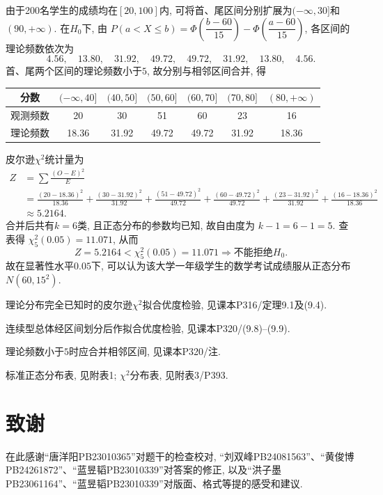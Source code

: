 \documentclass[standard]{ExBook}
\begin{document}
\begin{qitems}
由于200名学生的成绩均在$[20,100]$内, 可将首、尾区间分别扩展为$(-\infty,30]$和$(90,+\infty)$. 在$H_0$下, 由
$
P(a<X\leqslant b)
=\Phi\left(\dfrac{b-60}{15}\right)
-\Phi\left(\dfrac{a-60}{15}\right)
$,
各区间的理论频数依次为
$$
4.56,\quad 13.80,\quad 31.92,\quad 49.72,\quad
49.72,\quad 31.92,\quad 13.80,\quad 4.56.
$$
首、尾两个区间的理论频数小于$5$, 故分别与相邻区间合并, 得
\begin{center}
\setlength{\tabcolsep}{14pt}
\begin{tabular}{c|cccccc}
\hline
分数 & $(-\infty,40]$ & $(40,50]$ & $(50,60]$
& $(60,70]$ & $(70,80]$ & $(80,+\infty)$\\
\hline
观测频数 & 20 & 30 & 51 & 60 & 23 & 16\\
理论频数 & 18.36 & 31.92 & 49.72 & 49.72 & 31.92 & 18.36\\
\hline
\end{tabular}
\end{center}
皮尔逊$\chi^2$统计量为
$$
\begin{aligned}
Z
&=\sum\frac{(O-E)^2}{E}\\
&=\frac{(20-18.36)^2}{18.36}
+\frac{(30-31.92)^2}{31.92}
+\frac{(51-49.72)^2}{49.72}
+\frac{(60-49.72)^2}{49.72}
+\frac{(23-31.92)^2}{31.92}
+\frac{(16-18.36)^2}{18.36}\\
&\approx5.2164.
\end{aligned}
$$
合并后共有$k=6$类, 且正态分布的参数均已知, 故自由度为
$
k-1=6-1=5
$.
查表得
$
\chi_5^2(0.05)=11.071
$,
从而
$$
Z=5.2164<\chi_5^2(0.05)=11.071
\Longrightarrow
\text{不能拒绝}H_0.
$$
故在显著性水平$0.05$下, 可以认为该大学一年级学生的数学考试成绩服从正态分布$N(60,15^2)$.

\textcolor{themeColor}{\selectfont {} 理论分布完全已知时的皮尔逊$\chi^2$拟合优度检验, 见课本P316/定理9.1及(9.4).}

\textcolor{themeColor}{\selectfont {} 连续型总体经区间划分后作拟合优度检验, 见课本P320/(9.8)--(9.9).}

\textcolor{themeColor}{\selectfont {} 理论频数小于$5$时应合并相邻区间, 见课本P320/注.}

\textcolor{themeColor}{\selectfont {} 标准正态分布表, 见附表1; $\chi^2$分布表, 见附表3/P393.}
\end{qitems}


\section*{致谢}

在此感谢``唐洋阳PB23010365''对题干的检查校对, ``刘双峰PB24081563''、``黄俊博PB24261872''、``蓝昱韬PB23010339''对答案的修正, 以及``洪子墨PB23061164''、``蓝昱韬PB23010339''对版面、格式等提的感受和建议.
\end{document}
